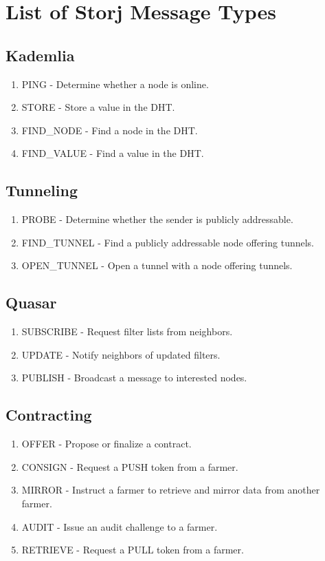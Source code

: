 \documentclass[a4paper,10pt]{article}
\begin{document}
\newpage
\appendix
\section{List of Storj Message Types}
\subsection{Kademlia}
\begin{enumerate}
\item PING - Determine whether a node is online.
\item STORE - Store a value in the DHT.
\item FIND\_NODE - Find a node in the DHT.
\item FIND\_VALUE - Find a value in the DHT.
\setcounter{enumTemp}{\theenumi}
\end{enumerate}
\subsection{Tunneling}
\begin{enumerate}
\setcounter{enumi}{\theenumTemp}
\item PROBE - Determine whether the sender is publicly addressable.
\item FIND\_TUNNEL - Find a publicly addressable node offering tunnels.
\item OPEN\_TUNNEL - Open a tunnel with a node offering tunnels.
\setcounter{enumTemp}{\theenumi}
\end{enumerate}
\subsection{Quasar}
\begin{enumerate}
\setcounter{enumi}{\theenumTemp}
\item SUBSCRIBE - Request filter lists from neighbors.
\item UPDATE - Notify neighbors of updated filters.
\item PUBLISH - Broadcast a message to interested nodes.
\setcounter{enumTemp}{\theenumi}
\end{enumerate}
\subsection{Contracting}
\begin{enumerate}
\setcounter{enumi}{\theenumTemp}
\item OFFER - Propose or finalize a contract.
\item CONSIGN - Request a PUSH token from a farmer.
\item MIRROR - Instruct a farmer to retrieve and mirror data from another farmer.
\item AUDIT - Issue an audit challenge to a farmer.
\item RETRIEVE - Request a PULL token from a farmer.
\end{enumerate}


\newpage

\begingroup
  \raggedright
  
\endgroup
\end{document}
